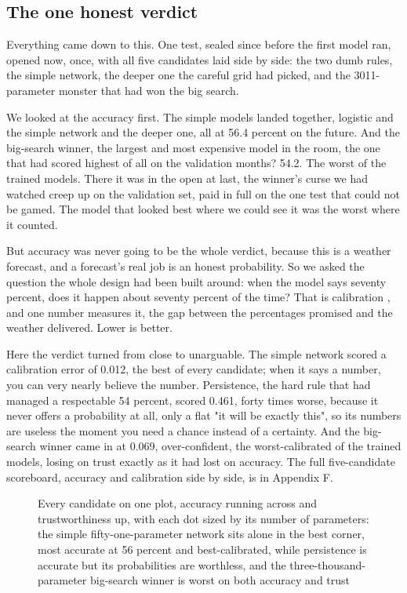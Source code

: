 \documentclass[11pt]{article} %
\begin{document}
\subsection{The one honest verdict}


Everything came down to this. One test, sealed since before the first model ran, opened now, once, with all five candidates laid side by side: the two dumb rules, the simple network, the deeper one the careful grid had picked, and the 3011-parameter monster that had won the big search.

We looked at the accuracy first. The simple models landed together, logistic and the simple network and the deeper one, all at 56.4 percent on the future. And the big-search winner, the largest and most expensive model in the room, the one that had scored highest of all on the validation months? 54.2. The worst of the trained models. There it was in the open at last, the winner's curse we had watched creep up on the validation set, paid in full on the one test that could not be gamed. The model that looked best where we could see it was the worst where it counted.

But accuracy was never going to be the whole verdict, because this is a weather forecast, and a forecast's real job is an honest probability. So we asked the question the whole design had been built around: when the model says seventy percent, does it happen about seventy percent of the time? That is calibration \cite{guo:2017}, and one number measures it, the gap between the percentages promised and the weather delivered. Lower is better.

Here the verdict turned from close to unarguable. The simple network scored a calibration error of 0.012, the best of every candidate; when it says a number, you can very nearly believe the number. Persistence, the hard rule that had managed a respectable 54 percent, scored 0.461, forty times worse, because it never offers a probability at all, only a flat "it will be exactly this", so its numbers are useless the moment you need a chance instead of a certainty. And the big-search winner came in at 0.069, over-confident, the worst-calibrated of the trained models, losing on trust exactly as it had lost on accuracy. The full five-candidate scoreboard, accuracy and calibration side by side, is in Appendix F.

\begin{figure}[htbp]
\centering

\caption{Every candidate on one plot, accuracy running across and trustworthiness up, with each dot sized by its number of parameters: the simple fifty-one-parameter network sits alone in the best corner, most accurate at 56 percent and best-calibrated, while persistence is accurate but its probabilities are worthless, and the three-thousand-parameter big-search winner is worst on both accuracy and trust}
\end{figure}
\end{document}
